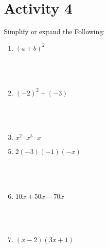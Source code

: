 \documentclass{article}
\begin{document}
\section*{Activity 4}
Simplify or expand the Following:\\
\begin{minipage}[t]{0.45\textwidth}
    \begin{enumerate}
        \item $(a+b)^2$
        \\\\\\\\
        \item $(-2)^2 + (-3)$
        \\\\\\\\
        \item $x^2 \cdot x^3 \cdot x$ 
    \end{enumerate}
\end{minipage}%
\hfill
\begin{minipage}[t]{0.45\textwidth}
    \begin{enumerate}
        \setcounter{enumi}{4} %
        \item $2(-3)(-1)(-x)$
        \\\\\\\\
        \item $ 10x + 50x - 70x$
        \\\\\\\\
        \item $(x-2)(3x+1)$

    \end{enumerate}
\end{minipage}
\vspace{3cm}
\end{document}
